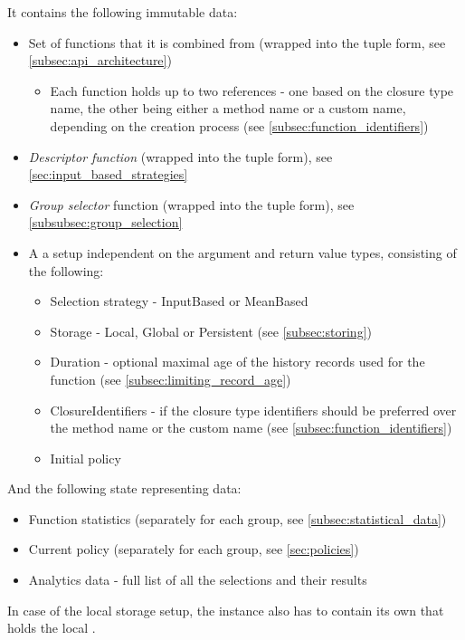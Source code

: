 It contains the following immutable data:

\begin{itemize}
	\item Set of functions that it is combined from (wrapped into the tuple form, see \ref{subsec:api_architecture})
	\begin{itemize}
		\item	Each function holds up to two references - one based on the closure type name, the other being either a method name or a custom name, depending on the creation process (see \ref{subsec:function_identifiers})
	\end{itemize}
	\item \textit{Descriptor function} (wrapped into the tuple form), see \ref{sec:input_based_strategies}
	\item \textit{Group selector} function (wrapped into the tuple form), see \ref{subsubsec:group_selection}
	\item A  a setup independent on the argument and return value types, consisting of the following:
	\begin{itemize}
		\item Selection strategy - InputBased or MeanBased
		\item Storage - Local, Global or Persistent (see \ref{subsec:storing})
		\item Duration - optional maximal age of the history records used for the function (see \ref{subsec:limiting_record_age})
		\item ClosureIdentifiers - if the closure type identifiers should be preferred over the method name or the custom name (see \ref{subsec:function_identifiers})
		\item Initial policy
	\end{itemize}
\end{itemize}

And the following state representing data:

\begin{itemize}
	\item Function statistics (separately for each group, see \ref{subsec:statistical_data})
	\item Current policy (separately for each group, see \ref{sec:policies})
	\item Analytics data - full list of all the selections and their results
\end{itemize}

In case of the local storage setup, the instance also has to contain its own  that holds the local .

